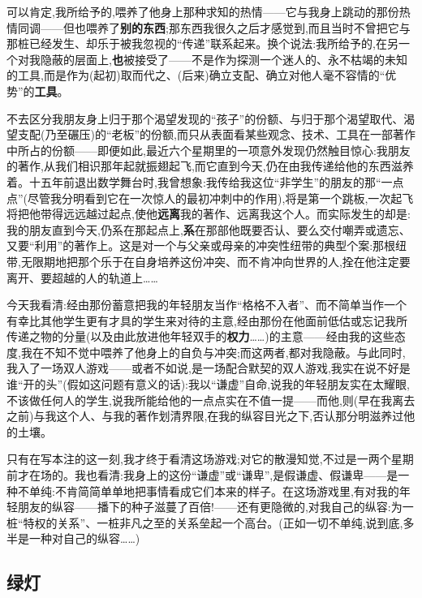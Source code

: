 可以肯定,我所给予的,喂养了他身上那种求知的热情\dmark{}——它与我身上跳动的那份热情同调——但也喂养了\textbf{别的东西};那东西我很久之后才感觉到,而且当时不曾把它与那桩已经发生、却乐于被我忽视的“传递”联系起来。换个说法:我所给予的,在另一个对我隐蔽的层面上,\textbf{也}被接受了——不是作为探测一个迷人的、永不枯竭的未知的工具,而是作为(起初)取而代之、(后来)确立支配、确立对他人毫不容情的“优势”的\textbf{工具}。

不去区分我朋友身上归于那个渴望发现的“孩子”的份额、与归于那个渴望取代、渴望支配(乃至碾压)的“老板”的份额,而只从表面看某些观念、技术、工具在一部著作中所占的份额——即便如此,最近六个星期里的一项意外发现仍然触目惊心:我朋友的著作,从我们相识那年起就振翅起飞,而它直到今天,仍在由我传递给他的东西滋养着。十五年前退出数学舞台时,我曾想象:我传给我这位“非学生”的朋友的那“一点点”(尽管我分明看到它在一次惊人的最初冲刺中的作用),将是第一个跳板,一次起飞将把他带得远远越过起点,使他\textbf{远离}我的著作、远离我这个人。而实际发生的却是:我的朋友直到今天,仍系在那起点上,\textbf{系}在那部他既要否认、要么交付嘲弄或遗忘、又要“利用”的著作上。这是对一个与父亲或母亲的冲突性纽带的典型个案:那根纽带,无限期地把那个乐于在自身培养这份冲突、而不肯冲向世界的人,拴在他注定要离开、要超越的人的轨道上……

今天我看清:经由那份蓄意把我的年轻朋友当作“格格不入者”、而不简单当作一个有幸比其他学生更有才具的学生来对待的主意,经由那份在他面前低估或忘记我所传递之物的分量(以及由此放进他年轻双手的\textbf{权力}……)的主意——经由我的这些态度,我在不知不觉中喂养了他身上的自负与冲突;而这两者,都对我隐蔽。与此同时,我入了一场双人游戏——或者不如说,是一场配合默契的双人游戏,我实在说不好是谁“开的头”(假如这问题有意义的话):我以“谦虚”自命,说我的年轻朋友实在太耀眼,不该做任何人的学生,说我所能给他的一点点实在不值一提——而他,则(早在我离去之前)与我这个人、与我的著作划清界限,在我的\dmark{}纵容目光之下,否认那分明滋养过他的土壤。

只有在写本注的这一刻,我才终于看清这场游戏;对它的散漫知觉,不过是一两个星期前才在场的。我也看清:我身上的这份“谦虚”或“谦卑”,是假谦虚、假谦卑——是一种不单纯:不肯简简单单地把事情看成它们本来的样子。在这场游戏里,有对我的年轻朋友的纵容——播下的种子滋蔓了百倍!——还有更隐微的,对我自己的纵容:为一桩“特权的关系”、一桩非凡之至的关系垒起一个高台。(正如一切不单纯,说到底,多半是一种对自己的纵容……)

\subsection{绿灯}

